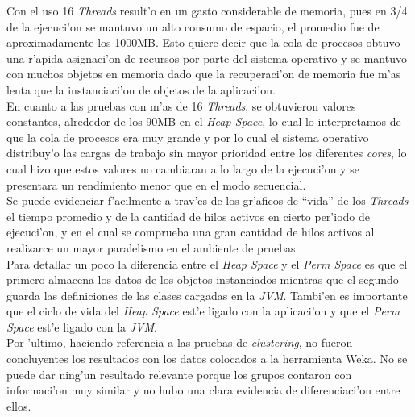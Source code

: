 Con el uso 16 \emph{Threads} result'o en un gasto considerable de memoria, pues en 3/4 de la ejecuci'on se mantuvo un alto consumo de espacio, el promedio fue de aproximadamente los 1000MB. Esto quiere decir que la cola de procesos obtuvo una r'apida asignaci'on de recursos por parte del sistema operativo y se mantuvo con muchos objetos en memoria dado que la recuperaci'on de memoria fue m'as lenta que la instanciaci'on de objetos de la aplicaci'on. \\

En cuanto a las pruebas con m'as de 16 \emph{Threads}, se obtuvieron valores constantes, alrededor de los 90MB en el \emph{Heap Space}, lo cual lo interpretamos de que la cola de procesos era muy grande y por lo cual el sistema operativo distribuy'o las cargas de trabajo sin mayor prioridad entre los diferentes \emph{cores}, lo cual hizo que estos valores no cambiaran a lo largo de la ejecuci'on y se presentara un rendimiento menor que en el modo secuencial.\\

Se puede evidenciar f'acilmente a trav'es de los gr'aficos de ``vida'' de los \emph{Threads} el tiempo promedio y de la cantidad de hilos activos en cierto per'iodo de ejecuci'on, y en el cual se comprueba una gran cantidad de hilos activos al realizarce un mayor paralelismo en el ambiente de pruebas.\\

Para detallar un poco la diferencia entre el \emph{Heap Space} y el \emph{Perm Space} es que el primero almacena los datos de los objetos instanciados mientras que el segundo guarda las definiciones de las clases cargadas en la \emph{JVM}. Tambi'en es importante que el ciclo de vida del \emph{Heap Space} est'e ligado con la aplicaci'on y que el \emph{Perm Space} est'e ligado con la \emph{JVM}.\\

Por 'ultimo, haciendo referencia a las pruebas de \emph{clustering}, no fueron concluyentes los resultados con los datos colocados a la herramienta Weka. No se puede dar ning'un resultado relevante porque los grupos contaron con informaci'on muy similar y no hubo una clara evidencia de diferenciaci'on entre ellos.\\

\clearpage